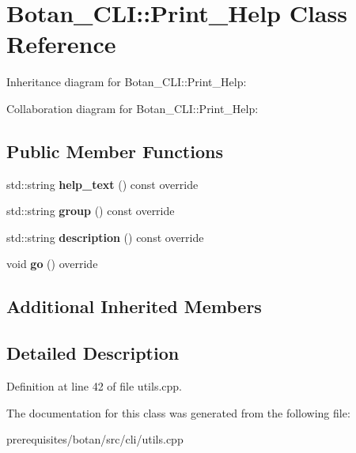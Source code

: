 \hypertarget{class_botan___c_l_i_1_1_print___help}{}\section{Botan\+\_\+\+C\+LI\+:\+:Print\+\_\+\+Help Class Reference}
\label{class_botan___c_l_i_1_1_print___help}


Inheritance diagram for Botan\+\_\+\+C\+LI\+:\+:Print\+\_\+\+Help\+:


Collaboration diagram for Botan\+\_\+\+C\+LI\+:\+:Print\+\_\+\+Help\+:
\subsection*{Public Member Functions}
\begin{DoxyCompactItemize}
\item 
\mbox{\label{class_botan___c_l_i_1_1_print___help_a16b4035835213de7035a82a38682ac4e}} 
std\+::string {\bfseries help\+\_\+text} () const override
\item 
\mbox{\label{class_botan___c_l_i_1_1_print___help_a6cdfd083f5e3d62493bb84a65365e1a0}} 
std\+::string {\bfseries group} () const override
\item 
\mbox{\label{class_botan___c_l_i_1_1_print___help_a401c56a73334e78d27b13131e24f9bd4}} 
std\+::string {\bfseries description} () const override
\item 
\mbox{\label{class_botan___c_l_i_1_1_print___help_af8fbf19c98c93a13ee72350f09fa5ebe}} 
void {\bfseries go} () override
\end{DoxyCompactItemize}
\subsection*{Additional Inherited Members}


\subsection{Detailed Description}


Definition at line 42 of file utils.\+cpp.



The documentation for this class was generated from the following file\+:\begin{DoxyCompactItemize}
\item 
prerequisites/botan/src/cli/utils.\+cpp\end{DoxyCompactItemize}
